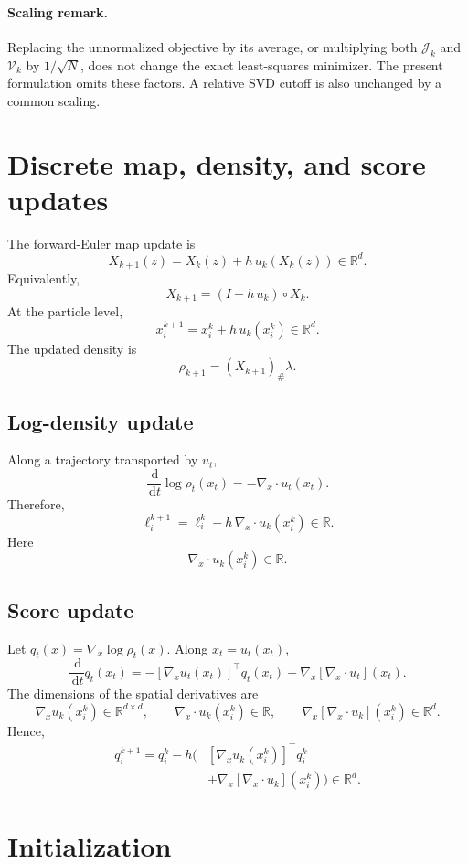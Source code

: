 \documentclass[11pt]{article}
\newcommand{\R}{\mathbb{R}}
\newcommand{\dd}{\,\mathrm{d}}
\newcommand{\Id}{I}
\begin{document}
\paragraph{Scaling remark.}
Replacing the unnormalized objective by its average, or multiplying both $\mathcal J_k$ and $\mathcal V_k$ by $1/\sqrt N$, does not change the exact least-squares minimizer. The present formulation omits these factors. A relative SVD cutoff is also unchanged by a common scaling.

\section{Discrete map, density, and score updates}

The forward-Euler map update is
\[
\boxed{
X_{k+1}(z)
=
X_k(z)+h\,u_k(X_k(z))
\in\R^d.
}
\]
Equivalently,
\[
X_{k+1}=(\Id+h\,u_k)\circ X_k.
\]
At the particle level,
\[
\boxed{
x_i^{k+1}
=
x_i^k+h\,u_k(x_i^k)
\in\R^d.
}
\]
The updated density is
\[
\rho_{k+1}=(X_{k+1})_{\#}\lambda.
\]

\subsection{Log-density update}

Along a trajectory transported by $u_t$,
\[
\frac{\dd}{\dd t}\log\rho_t(x_t)
=-\nabla_x\cdot u_t(x_t).
\]
Therefore,
\[
\boxed{
\ell_i^{k+1}
=
\ell_i^k-h\,\nabla_x\cdot u_k(x_i^k)
\in\R.
}
\]
Here
\[
\nabla_x\cdot u_k(x_i^k)\in\R.
\]

\subsection{Score update}

Let $q_t(x)=\nabla_x\log\rho_t(x)$. Along $\dot x_t=u_t(x_t)$,
\[
\frac{\dd}{\dd t}q_t(x_t)
=
-[\nabla_xu_t(x_t)]^\top q_t(x_t)
-\nabla_x[\nabla_x\cdot u_t](x_t).
\]
The dimensions of the spatial derivatives are
\[
\nabla_xu_k(x_i^k)\in\R^{d\times d},
\qquad
\nabla_x\cdot u_k(x_i^k)\in\R,
\qquad
\nabla_x[\nabla_x\cdot u_k](x_i^k)\in\R^d.
\]
Hence,
\[
\boxed{
\begin{aligned}
q_i^{k+1}
=
q_i^k-h\Big(&[\nabla_xu_k(x_i^k)]^\top q_i^k\\
&+\nabla_x[\nabla_x\cdot u_k](x_i^k)\Big)
\in\R^d.
\end{aligned}
}
\]

\section{Initialization}
\end{document}
